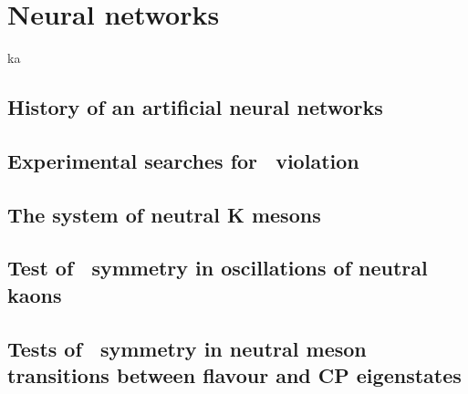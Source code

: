 
\chapter{Neural networks}\label{chapter:symmetries}

ka
\section{History of an artificial neural networks}

\section{Experimental searches for \Ts~violation}

\section{The system of neutral K mesons}

\section{Test of \Ts~symmetry in oscillations of neutral kaons}

\section[Tests of \Ts~symmetry in neutral meson transitions between\newline flavour and CP eigenstates]{Tests of \Ts~symmetry in neutral meson transitions between flavour and CP eigenstates}


